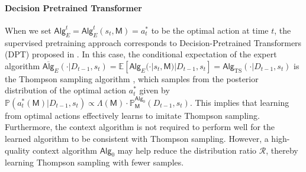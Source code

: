 \documentclass[10pt]{article}
\renewcommand{\epsilon}{\varepsilon}
\newcommand{\<}{\left\langle}
\renewcommand{\>}{\right\rangle}
\newcommand{\brac}[1]{{\left[ #1 \right]}}
\newcommand{\E}{\mathbb{E}}
\renewcommand{\P}{\mathbb{P}}
\newcommand{\inst}{{\mathsf{M}}}
\newcommand{\TS}{{\mathrm{TS}}}
\newcommand{\state}{{s}}
\newcommand{\action}{{a}}
\newcommand{\totlen}{{T}} %
\newcommand{\sAlg}{{\mathsf{Alg}}}
\newcommand{\osAlg}{\overline{\mathsf{Alg}}}
\newcommand{\dset}{{D}}
\newcommand{\Numobs}{{n}}   %
\newcommand{\Parspace}{{\Theta}}
\newcommand{\EstPar}{{\widehat{\theta}}}
\newcommand{\prior}{{\Lambda}}
\newcommand{\shortexp}{{E}}
\newcommand{\geneps}{{\epsilon}_{\sf real}}
\newcommand{\totreward}{{\mathfrak{R}}}  %
\newcommand{\genrewardb}{{\mathrm{R}}}
\newcommand{\distratio}{{\mathcal{R}}}
\begin{document}

\paragraph{Decision Pretrained Transformer} When we set $\sAlg_\shortexp^t = \sAlg_\shortexp^t(\state_t,\inst)=\action^*_t$ to be the optimal action at time $t$, the supervised pretraining approach corresponds to Decision-Pretrained Transformers (DPT) proposed in \cite{lee2023supervised}. In this case, the conditional expectation of the expert algorithm $\osAlg_\shortexp(\cdot|\dset_{t-1},\state_t)=\E[\sAlg_{\shortexp}(\cdot|\state_t,\inst)|\dset_{t-1},\state_t]=\sAlg_{\TS}(\cdot|\dset_{t-1},\state_t)$ is the Thompson sampling algorithm \citep[Theorem 1]{lee2023supervised}, which samples from the posterior distribution of the optimal action $\action^*_t$ given by $\P(a^*_t(\inst) |\dset_{t-1},\state_t)\propto \prior(\inst)\cdot\P_\inst^{\sAlg_0}(\dset_{t-1},\state_t)$. This implies that learning from optimal actions effectively learns to imitate Thompson sampling. Furthermore, the context algorithm is not required to perform well for the learned algorithm to be consistent with Thompson sampling. However, a high-quality context algorithm $\sAlg_0$ may help reduce the distribution ratio $\distratio$, thereby learning Thompson sampling with fewer samples. 


\end{document}
